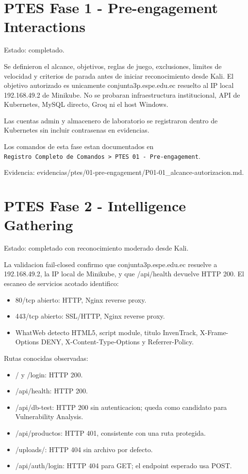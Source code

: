 \section{PTES Fase 1 - Pre-engagement Interactions}\label{ptes-fase-1---pre-engagement-interactions}

Estado: completado.

Se definieron el alcance, objetivos, reglas de juego, exclusiones, limites de velocidad y criterios de parada antes de iniciar reconocimiento desde Kali. El objetivo autorizado es unicamente conjunta3p.espe.edu.ec resuelto al IP local 192.168.49.2 de Minikube. No se probaran infraestructura institucional, API de Kubernetes, MySQL directo, Groq ni el host Windows.

Las cuentas admin y almacenero de laboratorio se registraron dentro de Kubernetes sin incluir contrasenas en evidencias.

Los comandos de esta fase estan documentados en \texttt{Registro\ Completo\ de\ Comandos\ \textgreater{}\ PTES\ 01\ -\ Pre-engagement}.

Evidencia: evidencias/ptes/01-pre-engagement/P01-01\_alcance-autorizacion.md.

\section{PTES Fase 2 - Intelligence Gathering}\label{ptes-fase-2---intelligence-gathering}

Estado: completado con reconocimiento moderado desde Kali.

La validacion fail-closed confirmo que conjunta3p.espe.edu.ec resuelve a 192.168.49.2, la IP local de Minikube, y que /api/health devuelve HTTP 200. El escaneo de servicios acotado identifico:

\begin{itemize}
\tightlist
\item
  80/tcp abierto: HTTP, Nginx reverse proxy.
\item
  443/tcp abierto: SSL/HTTP, Nginx reverse proxy.
\item
  WhatWeb detecto HTML5, script module, titulo InvenTrack, X-Frame-Options DENY, X-Content-Type-Options y Referrer-Policy.
\end{itemize}

Rutas conocidas observadas:

\begin{itemize}
\tightlist
\item
  / y /login: HTTP 200.
\item
  /api/health: HTTP 200.
\item
  /api/db-test: HTTP 200 sin autenticacion; queda como candidato para Vulnerability Analysis.
\item
  /api/productos: HTTP 401, consistente con una ruta protegida.
\item
  /uploads/: HTTP 404 sin archivo por defecto.
\item
  /api/auth/login: HTTP 404 para GET; el endpoint esperado usa POST.
\end{itemize}

